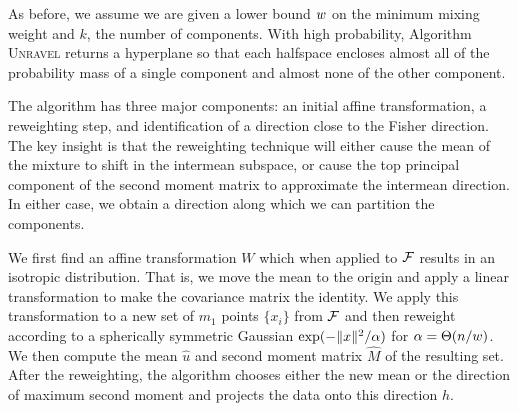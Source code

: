 \documentclass{book}
\numberwithin{exercise}{chapter}
\begin{document}
{As before, we assume we are given a lower bound $w$ on the minimum mixing
weight and $k$, the number of components.  With high
probability,  Algorithm \textsc{Unravel} returns a hyperplane so that each halfspace encloses almost
all of the probability mass of a single component and almost none of
the other component.

The algorithm has three major components: an initial affine
transformation, a reweighting step, and identification of a direction
close to the Fisher direction. The key
insight is that the reweighting technique will either cause the mean
of the mixture to shift in the intermean subspace, or cause the top
principal component of the second moment matrix to approximate
the intermean direction.  In either case, we obtain a direction along
which we can partition the components.

We first find an affine transformation $W$ which when applied to
${\mathcal{F}}$ results in an isotropic distribution.  That is, we move the
mean to the origin and apply a linear transformation to make the
covariance matrix the identity. We apply this transformation to a new
set of $m_1$ points $\{x_i\}$ from ${\mathcal{F}}$ and then reweight according
to a spherically symmetric Gaussian $\exp(-\|x\|^2/{\alpha})$ for
${\alpha} = \Theta(n/w)$.  We then compute the mean $\hat{u}$ and second
moment matrix $\hat{M}$ of the resulting set. After the reweighting, the algorithm chooses either the new mean or the direction of maximum second moment and projects the data onto this direction $h$.

\begin{center}
\end{center}}
\end{document}
